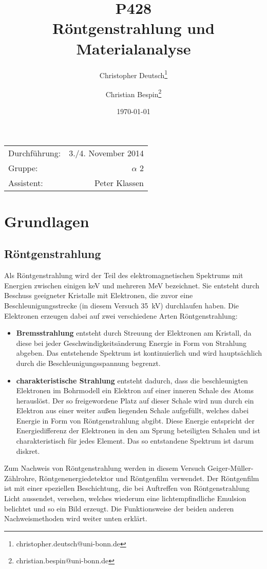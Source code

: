 \documentclass[10pt, a4paper]{article}
\title{P428 \\ Röntgenstrahlung und Materialanalyse}
\author{Christopher Deutsch\footnote{christopher.deutsch@uni-bonn.de} \and Christian Bespin\footnote{christian.bespin@uni-bonn.de}}
\date{\today}
\begin{document}
\maketitle

\begin{center}
\begin{tabular}{l r}
Durchführung: & 3./4. November 2014 \\
Gruppe: & $\alpha$ 2 \\
Assistent: & Peter Klassen
\end{tabular}
\end{center}

\begin{abstract}
\noindent
\end{abstract}

\tableofcontents
\newpage


\section{Grundlagen}
\subsection{Röntgenstrahlung}
  Als Röntgenstrahlung wird der Teil des elektromagnetischen Spektrums mit Energien zwischen einigen keV und mehreren MeV \cite{demtroeder} bezeichnet.
  Sie entsteht durch Beschuss geeigneter Kristalle mit Elektronen, die zuvor eine Beschleunigungsstrecke (in diesem Versuch \SI{35}{\kilo\volt}) durchlaufen haben.
  Die Elektronen erzeugen dabei auf zwei verschiedene Arten Röntgenstrahlung:
  \begin{itemize}
  \item \textbf{Bremsstrahlung} entsteht durch Streuung der Elektronen am Kristall, da diese bei jeder Geschwindigkeitsänderung Energie in Form von Strahlung abgeben.
  Das entstehende Spektrum ist kontinuierlich und wird hauptsächlich durch die Beschleunigungsspannung begrenzt.
  \item \textbf{charakteristische Strahlung} entsteht dadurch, dass die beschleunigten Elektronen im Bohrmodell ein Elektron auf einer inneren Schale des Atoms herauslöst.
  Der so freigewordene Platz auf dieser Schale wird nun durch ein Elektron aus einer weiter außen liegenden Schale aufgefüllt, welches dabei Energie in Form von Röntgenstrahlung abgibt.
  Diese Energie entspricht der Energiedifferenz der Elektronen in den am Sprung beteiligten Schalen und ist charakteristisch für jedes Element.
  Das so entstandene Spektrum ist darum diskret.
  \end{itemize}
Zum Nachweis von Röntgenstrahlung werden in diesem Versuch Geiger-Müller-Zählrohre, Röntgenenergiedetektor und Röntgenfilm verwendet.
Der Röntgenfilm ist mit einer speziellen Beschichtung, die bei Auftreffen von Röntgenstrahlung Licht aussendet, versehen, welches wiederum eine lichtempfindliche Emulsion belichtet und so ein Bild erzeugt.
Die Funktionsweise der beiden anderen Nachweismethoden wird weiter unten erklärt.
\end{document}
